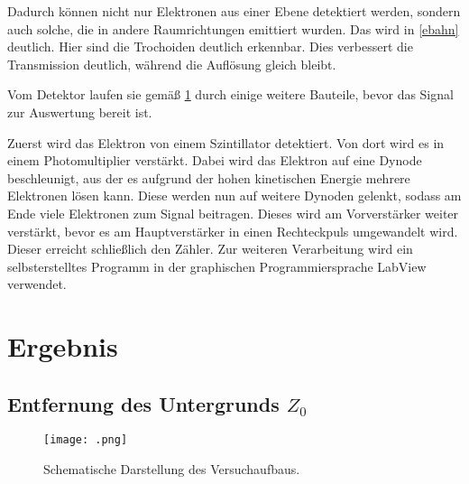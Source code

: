 
Dadurch können nicht nur Elektronen aus einer Ebene detektiert werden, sondern auch solche, die in andere Raumrichtungen emittiert wurden. Das wird in \cref{ebahn} deutlich. Hier sind die Trochoiden deutlich erkennbar. Dies verbessert die Transmission deutlich, während die Auflösung gleich bleibt.


Vom Detektor laufen sie gemäß \cref{aufbau} durch einige weitere Bauteile, bevor das Signal zur Auswertung bereit ist.


Zuerst wird das Elektron von einem Szintillator detektiert. Von dort wird es in einem Photomultiplier verstärkt. Dabei wird das Elektron auf eine Dynode beschleunigt, aus der es aufgrund der hohen kinetischen Energie mehrere Elektronen lösen kann. Diese werden nun auf weitere Dynoden gelenkt, sodass am Ende viele Elektronen zum Signal beitragen. Dieses wird am Vorverstärker weiter verstärkt, bevor es am Hauptverstärker in einen Rechteckpuls umgewandelt wird. Dieser erreicht schließlich den Zähler. Zur weiteren Verarbeitung wird ein selbsterstelltes Programm in der graphischen Programmiersprache LabView verwendet.


\section{Ergebnis}
\subsection{Entfernung des Untergrunds $Z_{0}$}

\begin{figure}[h]
	\centering
	\texttt{[image: .png]}
	\label{aufbau}
	\caption{Schematische Darstellung des Versuchaufbaus.}
\end{figure}